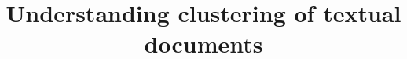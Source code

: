 \documentclass[10pt]{article}
\title{Understanding clustering of textual documents}
\begin{document}
\maketitle

\newcommand{\op}[1]{\operatorname{#1}}


\newcommand{\CC}{{\mathcal C}}

\renewcommand{\O}{{\mathcal O}}

\newcommand{\E}{{\mathcal E}}
\newcommand{\F}{{\mathcal F}}

\newcommand{\g}{{\mathfrak g}}
\newcommand{\h}{{\mathfrak h}}

\renewcommand{\k}{{\bf k}}
\newcommand{\kk}{{\overline{\bf k}}}





\newtheorem{thm}{Theorem}[section]
\newtheorem{conj}[thm]{Conjecture}
\newtheorem{cor}[thm]{Corollary}
\newtheorem{prop}[thm]{Proposition}
\newtheorem{lemma}[thm]{Lemma}
\newenvironment{pf}{\paragraph{Proof}}{\qed\par\medskip}
\newtheorem{defn}[thm]{Definition}
\newtheorem{formula}[thm]{Formula}
\newtheorem{thm*}[thm]{Theorem$^*$}
\newtheorem{remark}[thm]{Remark}
\newtheorem{remarks}[thm]{Remarks}
\newtheorem{example}[thm]{Example}
\newtheorem{examples}[thm]{Examples}\newtheorem{ass}[thm]{Assumptions}
\newcommand {\A}{\mathcal A}

\newcommand {\halmos}{\hfill{$\blacksquare$}}
\newcommand{\D}{\operatorname{D}}
\newcommand{\diam}{\diamond}
\newcommand {\C}{\mathbb C}
\newcommand {\ol}[1]{\overline{#1}}
\newcommand {\IF}{\mathbb{F}}
\newcommand {\Hom}{\operatorname{Hom}}
\newcommand {\Aut}{\operatorname{Aut}}
\newcommand {\Ext}{\operatorname{Ext}}
\newcommand {\Rep}{\operatorname{Rep}}
\renewcommand {\H}{\operatorname{\mathcal H}}
\newcommand{\Vect}{\operatorname{Vect}}
\newcommand {\id}{\operatorname{id}}
\newcommand{\cplx}[4] {\begin{xy}
\xymatrix@=0pt@C=20pt@R=15pt{#1
\ar@<.5ex>[r]^{#2}		& \ar@<.5ex>[l]^{#3}  #4}
\end{xy}  }
\newcommand{\mat}[4]{\begin{pmatrix}#1&#2\\#3&#4\end{pmatrix}}
\end{document}
